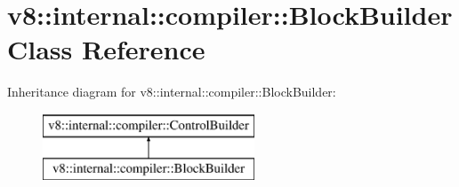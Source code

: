 \hypertarget{classv8_1_1internal_1_1compiler_1_1_block_builder}{}\section{v8\+:\+:internal\+:\+:compiler\+:\+:Block\+Builder Class Reference}
\label{classv8_1_1internal_1_1compiler_1_1_block_builder}
Inheritance diagram for v8\+:\+:internal\+:\+:compiler\+:\+:Block\+Builder\+:\begin{figure}[H]
\begin{center}
\leavevmode
\includegraphics[height=2.000000cm]{classv8_1_1internal_1_1compiler_1_1_block_builder}
\end{center}
\end{figure}
